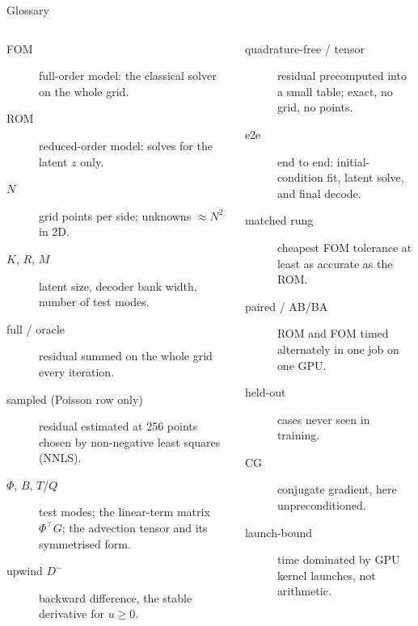 \documentclass[10pt,aspectratio=169]{beamer}
\newcommand{\T}{^{\top}}
\begin{document}
\begin{frame}{Glossary}
  \footnotesize
  \begin{columns}[T]
    \begin{description}
      \item[FOM] full-order model: the classical solver on the whole grid.
      \item[ROM] reduced-order model: solves for the latent $z$ only.
      \item[$N$] grid points per side; unknowns $\approx N^2$ in 2D.
      \item[$K$, $R$, $M$] latent size, decoder bank width, number of test modes.
      \item[full / oracle] residual summed on the whole grid every iteration.
      \item[sampled (Poisson row only)] residual estimated at 256 points chosen by non-negative least squares (NNLS).
      \item[$\Phi$, $B$, $T$/$Q$] test modes; the linear-term matrix $\Phi\T G$; the advection tensor and its symmetrised form.
      \item[upwind $D^-$] backward difference, the stable derivative for $u\ge0$.
    \end{description}
    \begin{description}
      \item[quadrature-free / tensor] residual precomputed into a small table; exact, no grid, no points.
      \item[e2e] end to end: initial-condition fit, latent solve, and final decode.
      \item[matched rung] cheapest FOM tolerance at least as accurate as the ROM.
      \item[paired / AB/BA] ROM and FOM timed alternately in one job on one GPU.
      \item[held-out] cases never seen in training.
      \item[CG] conjugate gradient, here unpreconditioned.
      \item[launch-bound] time dominated by GPU kernel launches, not arithmetic.
    \end{description}
  \end{columns}
\end{frame}
\end{document}
